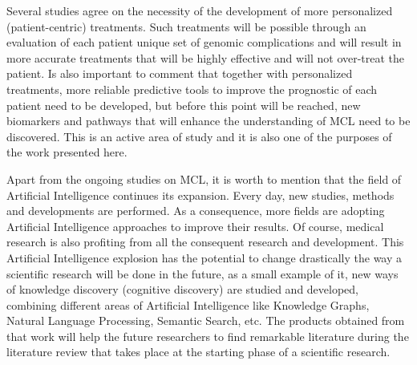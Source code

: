 Several studies\cite{Inamdar2016}\cite{Steiner2018}\cite{Schieber2018}\cite{Dreyling2016} agree on the necessity of the development of more personalized (patient-centric) treatments. Such treatments will be possible through an evaluation of each patient unique set of genomic complications and will result in more accurate treatments that will be highly effective and will not over-treat the patient. Is also important to comment that together with personalized treatments, more reliable predictive tools to improve the prognostic of each patient need to be developed, but before this point will be reached, new biomarkers and pathways that will enhance the understanding of MCL need to be discovered. This is an active area of study and it is also one of the purposes of the work presented here.

Apart from the ongoing studies on MCL, it is worth to mention that the field of Artificial Intelligence continues its expansion. Every day, new studies, methods and developments are performed. As a consequence, more fields are adopting Artificial Intelligence approaches to improve their results. Of course, medical research is also profiting from all the consequent research and development.
This Artificial Intelligence explosion has the potential to change drastically the way a scientific research will be done in the future, as a small example of it, new ways of knowledge discovery (cognitive discovery) are studied and developed, combining different areas of Artificial Intelligence like Knowledge Graphs, Natural Language Processing, Semantic Search, etc. The products obtained from that work will help the future researchers to find remarkable literature during the literature review that takes place at the starting phase of a scientific research.\cite{Raymond2019}